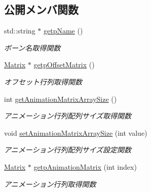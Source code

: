 \subsection*{公開メンバ関数}
\begin{DoxyCompactItemize}
\item 
std\+::string $\ast$ \mbox{\hyperlink{class_md_bin_object_1_1_bone_a253478f63c13730809e943a3928b7e50}{getp\+Name}} ()
\begin{DoxyCompactList}\small\item\em ボーン名取得関数 \end{DoxyCompactList}\item 
\mbox{\hyperlink{class_matrix}{Matrix}} $\ast$ \mbox{\hyperlink{class_md_bin_object_1_1_bone_ac700babba67e7d39ff6e894ca7831b51}{getp\+Offset\+Matrix}} ()
\begin{DoxyCompactList}\small\item\em オフセット行列取得関数 \end{DoxyCompactList}\item 
int \mbox{\hyperlink{class_md_bin_object_1_1_bone_a66f24e8fb5fccdb6abcbbedca365ee4e}{get\+Animation\+Matrix\+Array\+Size}} ()
\begin{DoxyCompactList}\small\item\em アニメーション行列配列サイズ取得関数 \end{DoxyCompactList}\item 
void \mbox{\hyperlink{class_md_bin_object_1_1_bone_ad3d6cc591c4a08d349095374c5e72d9c}{set\+Animation\+Matrix\+Array\+Size}} (int value)
\begin{DoxyCompactList}\small\item\em アニメーション行列配列サイズ設定関数 \end{DoxyCompactList}\item 
\mbox{\hyperlink{class_matrix}{Matrix}} $\ast$ \mbox{\hyperlink{class_md_bin_object_1_1_bone_a1fbda2e276ea0036c0f86145ae7dbd08}{getp\+Animation\+Matrix}} (int index)
\begin{DoxyCompactList}\small\item\em アニメーション行列取得関数 \end{DoxyCompactList}\end{DoxyCompactItemize}
